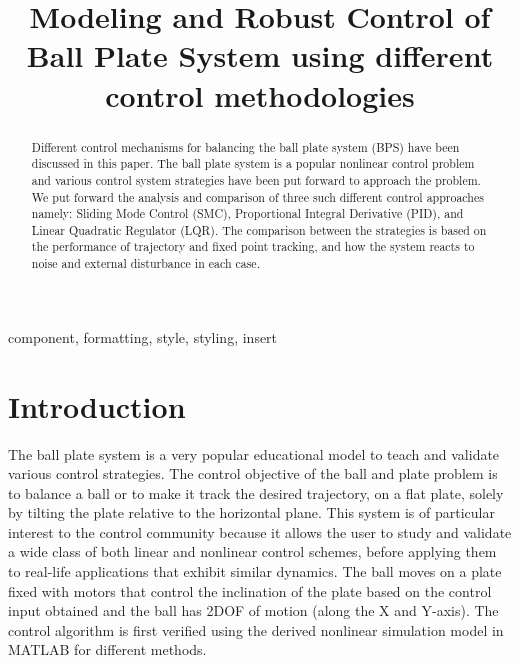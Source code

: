 \documentclass[conference]{IEEEtran}
\begin{document}
\title{Modeling and Robust Control of Ball Plate System using different control methodologies\\
}

\author{
\and
{}
}
\maketitle

\begin{abstract}
Different control mechanisms for balancing the ball plate system (BPS)  have been discussed in this paper. The ball plate system is a popular nonlinear control problem and various control system strategies have been put forward to approach the problem. We put forward the analysis and comparison of three such different control approaches namely: Sliding Mode Control (SMC), Proportional Integral Derivative (PID), and Linear Quadratic Regulator (LQR). The comparison between the strategies is based on the performance of trajectory and fixed point tracking, and how the system reacts to noise and external disturbance in each case.
\end{abstract}

\begin{IEEEkeywords}
component, formatting, style, styling, insert
\end{IEEEkeywords}

\section{Introduction}
The ball plate system is a very popular educational model to teach and validate various control strategies. The control objective of the ball and plate problem is to balance a ball or to make it track the desired trajectory, on a flat plate, solely by tilting the plate relative to the horizontal plane. This system is of particular interest to the control community because it allows the user to study and validate a wide class of both linear and nonlinear control schemes, before applying them to real-life applications that exhibit similar dynamics. The ball moves on a plate fixed with motors that control the inclination of the plate based on the control input obtained and the ball has 2DOF of motion (along the X and Y-axis). The control algorithm is first verified using the derived nonlinear simulation model in MATLAB for different methods.
\end{document}
